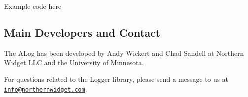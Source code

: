 \begin{DoxyCode}
Example code here
\end{DoxyCode}


\subsection*{Main Developers and Contact}

The A\+Log has been developed by Andy Wickert and Chad Sandell at Northern Widget L\+LC and the University of Minnesota.

For questions related to the Logger library, please send a message to us at \href{mailto:info@northernwidget.com}{\tt info@northernwidget.\+com}. 